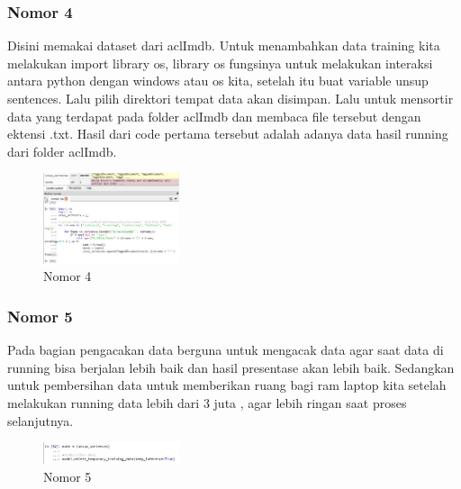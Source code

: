 \subsubsection{Nomor 4}
\hfill\break

Disini memakai dataset dari aclImdb. Untuk menambahkan data training kita melakukan import library os, library os fungsinya untuk melakukan interaksi antara python dengan windows atau os kita, setelah itu buat variable unsup sentences. Lalu pilih direktori tempat data akan disimpan. Lalu untuk mensortir data yang terdapat pada folder aclImdb dan membaca file tersebut dengan ektensi .txt. Hasil dari code pertama tersebut adalah adanya data hasil running dari folder aclImdb.
\begin{figure}[H]
\includegraphics[width=4cm]{figures/1174067/5/hasil4.jpg}
\centering
\caption{Nomor 4}
\end{figure}		

\subsubsection{Nomor 5}
\hfill\break

Pada bagian pengacakan data berguna untuk mengacak data agar saat data di running bisa berjalan lebih baik dan hasil presentase akan lebih baik. Sedangkan untuk pembersihan data untuk memberikan ruang bagi ram laptop kita setelah melakukan running data lebih dari 3 juta , agar lebih ringan saat proses selanjutnya.
\begin{figure}[H]
\includegraphics[width=4cm]{figures/1174067/5/hasil5.jpg}
\centering
\caption{Nomor 5}
\end{figure}	

